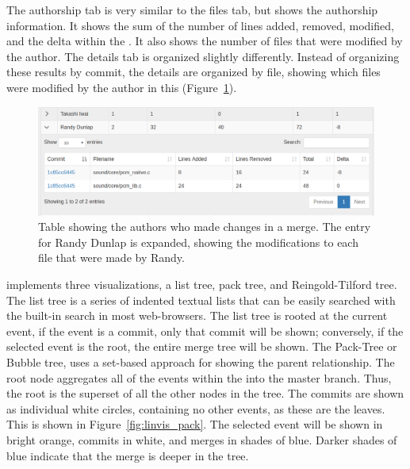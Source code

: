 \documentclass[draft]{IEEEtran}
\begin{document}
The authorship tab is very similar to the files tab, but shows the
authorship information. It shows the sum of the number of lines added,
removed, modified, and the delta within the \mt. It also shows
the number of files that were modified by the author. The details tab is
organized slightly differently. Instead of organizing these results by
commit, the details are organized by file, showing which files were
modified by the author in this \mt (Figure~\ref{fig:linvis_authors}).

\begin{figure}[htpb]
  \centering
  \includegraphics[width=1.0\linewidth]{figures/linvis/linvis_authors.png}
  \caption{Table showing the authors who made changes in a merge. The
    entry for Randy Dunlap is expanded, showing the modifications to
    each file that were made by Randy.}
  \label{fig:linvis_authors}
\end{figure}

\tool implements three visualizations, a list tree, pack tree, and
Reingold-Tilford tree. The list tree is a series of indented textual
lists that can be easily searched with the built-in search in most
web-browsers. The list tree is rooted at the current event, if the event
is a commit, only that commit will be shown; conversely, if the selected
event is the root, the entire merge tree will be shown. The Pack-Tree or
Bubble tree, uses a set-based approach for showing the parent
relationship. The root node aggregates all of the events within the \mt
into the master branch. Thus, the root is the superset of all the other
nodes in the tree. The commits are shown as individual white circles,
containing no other events, as these are the leaves. This is shown in
Figure~\ref{fig:linvis_pack}. The selected event will be shown in bright
orange, commits in white, and merges in shades of blue. Darker shades of
blue indicate that the merge is deeper in the tree.
\end{document}
